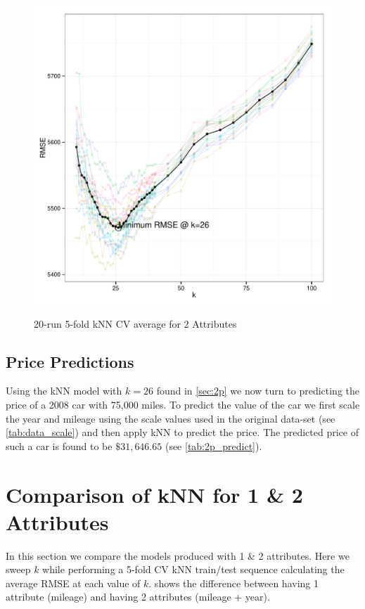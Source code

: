 \documentclass[11pt, fleqn]{article}
\begin{document}
\begin{figure}[!htb]
  \centering
  \caption{20-run 5-fold kNN CV average for 2 Attributes}
  \includegraphics[scale=.5]{2p_cv_multi_k.pdf}
  \label{fig:2p_k_multi}
\end{figure}

\subsection{Price Predictions}
Using the kNN model with $k=26$ found in \cref{sec:2p} we now turn to predicting the price of a 2008 car with 75,000 miles.  To predict the value of the car we first scale the year and mileage using the scale values used in the original data-set (see \cref{tab:data_scale}) and then apply kNN to predict the price.  The predicted price of such a car is found to be $\$31,646.65$ (see \cref{tab:2p_predict}).



\section{Comparison of kNN for 1 \& 2 Attributes}
In this section we compare the models produced with 1 \& 2 attributes.  Here we sweep $k$ while performing a 5-fold CV kNN train/test sequence calculating the average RMSE at each value of $k$.   shows the difference between having 1 attribute (mileage) and having 2 attributes (mileage + year).  
\end{document}
